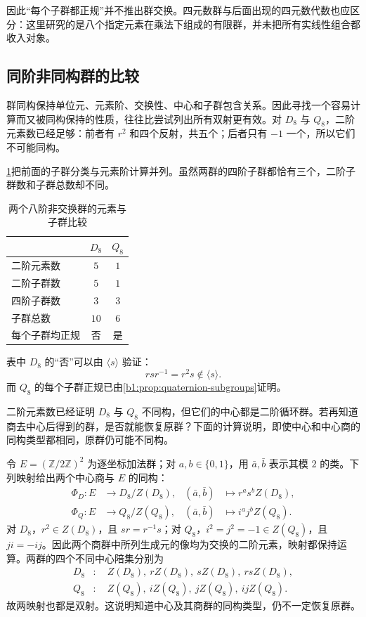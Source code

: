 因此“每个子群都正规”并不推出群交换。四元数群与后面出现的四元数代数也应区分：这里研究的是八个指定元素在乘法下组成的有限群，并未把所有实线性组合都收入对象。

\subsection{同阶非同构群的比较}
\label{b1:subsec:0303:03}

群同构保持单位元、元素阶、交换性、中心和子群包含关系。因此寻找一个容易计算而又被同构保持的性质，往往比尝试列出所有双射更有效。对 \(D_8\) 与 \(Q_8\)，二阶元素数已经足够：前者有 \(r^2\) 和四个反射，共五个；后者只有 \(-1\) 一个，所以它们不可能同构。

\ProseParagraphBreak
\cref{b1:tab:dihedral-quaternion-comparison}把前面的子群分类与元素阶计算并列。虽然两群的四阶子群都恰有三个，二阶子群数和子群总数却不同。
\begin{table}[htbp]
	\centering
	\caption{两个八阶非交换群的元素与子群比较}\label{b1:tab:dihedral-quaternion-comparison}
	\begin{tabular}{@{}lcc@{}}
		\toprule
		& \(D_8\) & \(Q_8\) \\
		\midrule
		二阶元素数 & \(5\) & \(1\) \\
		二阶子群数 & \(5\) & \(1\) \\
		四阶子群数 & \(3\) & \(3\) \\
		子群总数 & \(10\) & \(6\) \\
		每个子群均正规 & 否 & 是 \\
		\bottomrule
	\end{tabular}
\end{table}
表中 \(D_8\) 的“否”可以由 \(\langle s\rangle\) 验证：
\[
	rsr^{-1}=r^2s\notin\langle s\rangle.
\]
而 \(Q_8\) 的每个子群正规已由\cref{b1:prop:quaternion-subgroups}证明。

二阶元素数已经证明 \(D_8\) 与 \(Q_8\) 不同构，但它们的中心都是二阶循环群。若再知道商去中心后得到的群，是否就能恢复原群？下面的计算说明，即使中心和中心商的同构类型都相同，原群仍可能不同构。

\ProseParagraphBreak
令 \(E=(\mathbb Z/2\mathbb Z)^2\) 为逐坐标加法群；对 \(a,b\in\{0,1\}\)，用 \(\bar a,\bar b\) 表示其模 \(2\) 的类。下列映射给出两个中心商与 \(E\) 的同构：
\[
	\begin{aligned}
		\Phi_D:E&\longrightarrow D_8/Z(D_8),& (\bar a,\bar b)&\longmapsto r^as^bZ(D_8),\\
		\Phi_Q:E&\longrightarrow Q_8/Z(Q_8),& (\bar a,\bar b)&\longmapsto i^aj^bZ(Q_8).
	\end{aligned}
\]
对 \(D_8\)，\(r^2\in Z(D_8)\)，且 \(sr=r^{-1}s\)；对 \(Q_8\)，\(i^2=j^2=-1\in Z(Q_8)\)，且 \(ji=-ij\)。因此两个商群中所列生成元的像均为交换的二阶元素，映射都保持运算。两群的四个不同中心陪集分别为
\[
	\begin{aligned}
		D_8&:\quad Z(D_8),\ rZ(D_8),\ sZ(D_8),\ rsZ(D_8),\\
		Q_8&:\quad Z(Q_8),\ iZ(Q_8),\ jZ(Q_8),\ ijZ(Q_8).
	\end{aligned}
\]
故两映射也都是双射。这说明知道中心及其商群的同构类型，仍不一定恢复原群。

